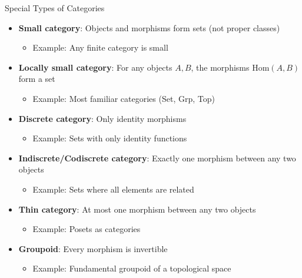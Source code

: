 \documentclass{beamer}
\begin{document}
\begin{frame}{Special Types of Categories}
    \begin{itemize}
        \item \textbf{Small category}: Objects and morphisms form sets (not proper classes)
            \begin{itemize}
                \item Example: Any finite category is small
            \end{itemize}
        \item \textbf{Locally small category}: For any objects $A, B$, the morphisms $\text{Hom}(A, B)$ form a set
            \begin{itemize}
                \item Example: Most familiar categories (Set, Grp, Top)
            \end{itemize}
        \item \textbf{Discrete category}: Only identity morphisms
            \begin{itemize}
                \item Example: Sets with only identity functions
            \end{itemize}
        \item \textbf{Indiscrete/Codiscrete category}: Exactly one morphism between any two objects
            \begin{itemize}
                \item Example: Sets where all elements are related
            \end{itemize}
        \item \textbf{Thin category}: At most one morphism between any two objects
            \begin{itemize}
                \item Example: Posets as categories
            \end{itemize}
        \item \textbf{Groupoid}: Every morphism is invertible
            \begin{itemize}
                \item Example: Fundamental groupoid of a topological space
            \end{itemize}
    \end{itemize}
\end{frame}
\end{document}
